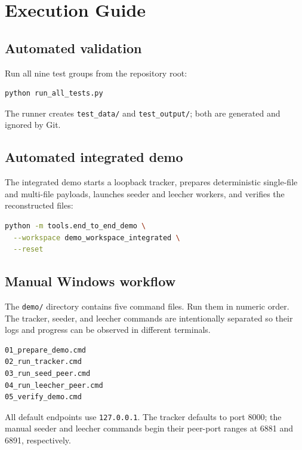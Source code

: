 \section{Execution Guide}
\label{app:execution}

\subsection{Automated validation}

Run all nine test groups from the repository root:

\begin{lstlisting}[language=bash,numbers=none]
python run_all_tests.py
\end{lstlisting}

The runner creates \texttt{test\_data/} and \texttt{test\_output/}; both are generated and ignored by Git.

\subsection{Automated integrated demo}

The integrated demo starts a loopback tracker, prepares deterministic single-file and multi-file payloads, launches seeder and leecher workers, and verifies the reconstructed files:

\begin{lstlisting}[language=bash,numbers=none]
python -m tools.end_to_end_demo \
  --workspace demo_workspace_integrated \
  --reset
\end{lstlisting}

\subsection{Manual Windows workflow}

The \texttt{demo/} directory contains five command files. Run them in numeric order. The tracker, seeder, and leecher commands are intentionally separated so their logs and progress can be observed in different terminals.

\begin{lstlisting}[language=bash,numbers=none]
01_prepare_demo.cmd
02_run_tracker.cmd
03_run_seed_peer.cmd
04_run_leecher_peer.cmd
05_verify_demo.cmd
\end{lstlisting}

All default endpoints use \texttt{127.0.0.1}. The tracker defaults to port 8000; the manual seeder and leecher commands begin their peer-port ranges at 6881 and 6891, respectively.
